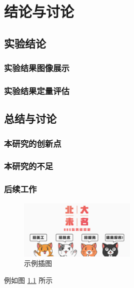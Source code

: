 \chapter{结论与讨论}
\section{实验结论}
\subsection{实验结果图像展示}
\subsection{实验结果定量评估}
\section{总结与讨论}
\subsection{本研究的创新点}
\subsection{本研究的不足}
\subsection{后续工作}



\begin{figure}[htbp!]
    \centering
    \includegraphics[width = 0.5\textwidth,natwidth=610,natheight=642]{chap/index_MKoueo.jpg}
    \caption{示例插图}\label{fig:example}
\end{figure}

\par
例如图 \ref{fig:example} 所示

